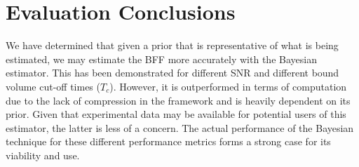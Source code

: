 \section{Evaluation Conclusions}
We have determined that given a prior that is representative of what is being estimated, we may estimate the BFF more accurately with the Bayesian estimator. This has been demonstrated for different SNR and different bound volume cut-off times ($T_c$). However, it is outperformed in terms of computation due to the lack of compression in the framework and is heavily dependent on its prior. Given that experimental data may be available for potential users of this estimator, the latter is less of a concern. The actual performance of the Bayesian technique for these different performance metrics forms a strong case for its viability and use.